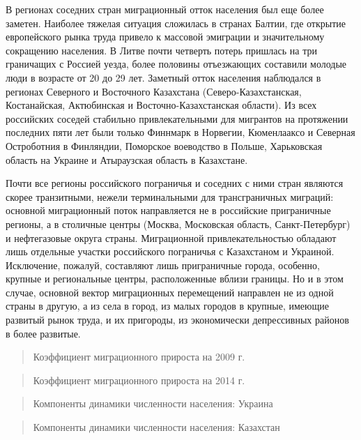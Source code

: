 \documentclass[]{book}
\begin{document}
В регионах соседних стран миграционный отток населения был еще более
заметен. Наиболее тяжелая ситуация сложилась в странах Балтии, где
открытие европейского рынка труда привело к массовой эмиграции и
значительному сокращению населения. В Литве почти четверть потерь
пришлась на три граничащих с Россией уезда, более половины отъезжающих
составили молодые люди в возрасте от 20 до 29 лет. Заметный отток
населения наблюдался в регионах Северного и Восточного Казахстана
(Северо-Казахстанская, Костанайская, Актюбинская и
Восточно-Казахстанская области). Из всех российских соседей стабильно
привлекательными для мигрантов на протяжении последних пяти лет были
только Финнмарк в Норвегии, Кюменлааксо и Северная Остроботния в
Финляндии, Поморское воеводство в Польше, Харьковская область на Украине
и Атыраузская область в Казахстане.

Почти все регионы российского пограничья и соседних с ними стран
являются скорее транзитными, нежели терминальными для трансграничных
миграций: основной миграционный поток направляется не в российские
приграничные регионы, а в столичные центры (Москва, Московская область,
Санкт-Петербург) и нефтегазовые округа страны. Миграционной
привлекательностью обладают лишь отдельные участки российского
пограничья с Казахстаном и Украиной. Исключение, пожалуй, составляют
лишь приграничные города, особенно, крупные и региональные центры,
расположенные вблизи границы. Но и в этом случае, основной вектор
миграционных перемещений направлен не из одной страны в другую, а из
села в город, из малых городов в крупные, имеющие развитый рынок труда,
и их пригороды, из экономически депрессивных районов в более развитые.

\begin{quote}
Коэффициент миграционного прироста на 2009 г.
\end{quote}

\begin{quote}
Коэффициент миграционного прироста на 2014 г.
\end{quote}

\begin{quote}
Компоненты динамики численности населения: Украина
\end{quote}

\begin{quote}
Компоненты динамики численности населения: Казахстан
\end{quote}


\end{document}
